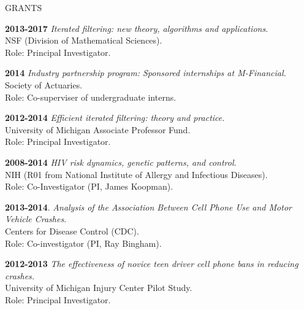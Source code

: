 \begin{mylist} {GRANTS}
\item{\bf 2013-2017 } {\em Iterated filtering: new theory, algorithms and applications}.\\
NSF (Division of Mathematical Sciences).\\
Role: Principal Investigator.


\item{\bf 2014 } {\em  Industry partnership program: Sponsored internships at M-Financial.}\\
Society of Actuaries.\\
Role: Co-superviser of undergraduate interns.

\item{\bf 2012-2014 } {\em Efficient iterated filtering: theory and practice.}\\
University of Michigan Associate Professor Fund.\\
Role: Principal Investigator.


\item{\bf 2008-2014 } {\em HIV risk dynamics, genetic patterns, and control.}\\
NIH (R01 from National Institute of Allergy and Infectious Diseases).\\
Role: Co-Investigator (PI, James Koopman).


\item {\bf 2013-2014}. {\em Analysis of the Association Between Cell Phone Use and Motor Vehicle Crashes}.\\
Centers for Disease Control (CDC).\\
Role: Co-investigator (PI, Ray Bingham).

\item {\bf 2012-2013 } {\em The effectiveness of novice teen driver cell phone bans in reducing crashes.}\\
University of Michigan Injury Center Pilot Study.\\
Role: Principal Investigator.


\end{mylist}
